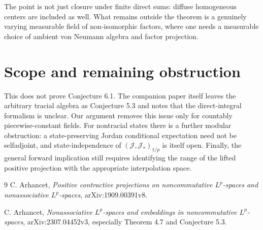 \documentclass[10pt]{article}
\newcommand{\J}{\mathcal J}
\begin{document}
The point is not just closure under finite direct sums: diffuse homogeneous
centers are included as well.  What remains outside the theorem is a genuinely
varying measurable field of non-isomorphic factors, where one needs a
measurable choice of ambient von Neumann algebra and factor projection.

\section*{Scope and remaining obstruction}

This does not prove Conjecture 6.1.  The companion paper itself leaves the
arbitrary tracial algebra as Conjecture 5.3 and notes that the direct-integral
formalism is unclear.  Our argument removes this issue only for countably
piecewise-constant fields.  For nontracial states there is a further modular
obstruction: a state-preserving Jordan conditional expectation need not be
selfadjoint, and state-independence of $(\J,\J_*)_{1/p}$ is itself open.
Finally, the general forward implication still requires identifying the range
of the lifted positive projection with the appropriate interpolation space.

\begin{thebibliography}{9}
C. Arhancet, \emph{Positive contractive projections on noncommutative
$L^p$-spaces and nonassociative $L^p$-spaces}, arXiv:1909.00391v8.

C. Arhancet, \emph{Nonassociative $L^p$-spaces and embeddings in
noncommutative $L^p$-spaces}, arXiv:2307.04452v3, especially Theorem 4.7 and
Conjecture 5.3.
\end{thebibliography}
\end{document}
